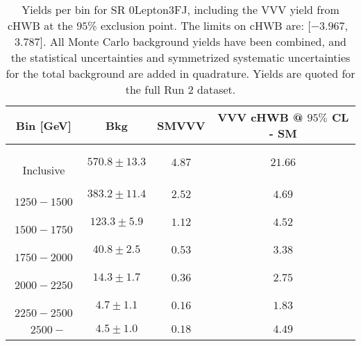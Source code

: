 \begin{table}[!htbp]
    \small
    \center
    \begin{tabular}{c||c|c|c}
    Bin [GeV] & Bkg & SMVVV & \pbox{20cm}{VVV \\ cHWB @ $95\%$ CL - SM \\ }\\
    \hline
    \pbox{20cm}{ ~ \\Inclusive\\ } & $570.8 \pm 13.3$ & $4.87$ & $21.66$\\
    \hline
    \pbox{20cm}{ ~ \\$1250-1500$\\ } & $383.2 \pm 11.4$ & $2.52$ & $4.69$\\
    \hline
    \pbox{20cm}{ ~ \\$1500-1750$\\ } & $123.3 \pm 5.9$ & $1.12$ & $4.52$\\
    \hline
    \pbox{20cm}{ ~ \\$1750-2000$\\ } & $40.8 \pm 2.5$ & $0.53$ & $3.38$\\
    \hline
    \pbox{20cm}{ ~ \\$2000-2250$\\ } & $14.3 \pm 1.7$ & $0.36$ & $2.75$\\
    \hline
    \pbox{20cm}{ ~ \\$2250-2500$\\ } & $4.7 \pm 1.1$ & $0.16$ & $1.83$\\
    \hline
    \pbox{20cm}{ ~ \\$2500-$\\ } & $4.5 \pm 1.0$ & $0.18$ & $4.49$\\
\end{tabular}
    \caption{Yields per bin for SR 0Lepton3FJ, including the VVV yield from cHWB at the $95$\% exclusion point. The limits on cHWB are: [$-3.967$,~$3.787$]. All Monte Carlo background yields have been combined, and the statistical uncertainties and symmetrized systematic uncertainties for the total background are added in quadrature. Yields are quoted for the full Run 2 dataset.}
    \label{tab:0Lepton3FJ$binssignal}
\end{table}
